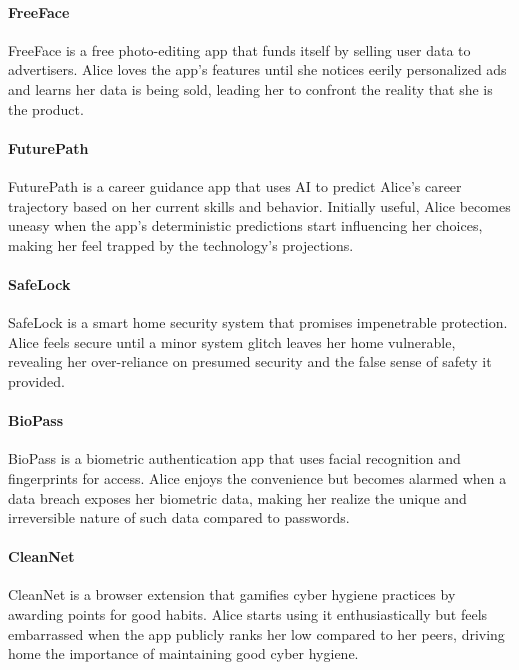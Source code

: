 \paragraph{FreeFace}
FreeFace is a free photo-editing app that funds itself by selling user data to advertisers. Alice loves the app's features until she notices eerily personalized ads and learns her data is being sold, leading her to confront the reality that she is the product.

\paragraph{FuturePath}
FuturePath is a career guidance app that uses AI to predict Alice's career trajectory based on her current skills and behavior. Initially useful, Alice becomes uneasy when the app's deterministic predictions start influencing her choices, making her feel trapped by the technology's projections.

\paragraph{SafeLock}
SafeLock is a smart home security system that promises impenetrable protection. Alice feels secure until a minor system glitch leaves her home vulnerable, revealing her over-reliance on presumed security and the false sense of safety it provided.

\paragraph{BioPass}
BioPass is a biometric authentication app that uses facial recognition and fingerprints for access. Alice enjoys the convenience but becomes alarmed when a data breach exposes her biometric data, making her realize the unique and irreversible nature of such data compared to passwords.

\paragraph{CleanNet} 
CleanNet is a browser extension that gamifies cyber hygiene practices by awarding points for good habits. Alice starts using it enthusiastically but feels embarrassed when the app publicly ranks her low compared to her peers, driving home the importance of maintaining good cyber hygiene.


